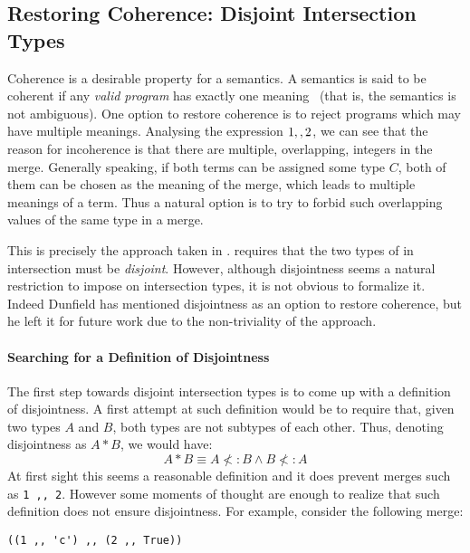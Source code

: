 \subsection{Restoring Coherence: Disjoint Intersection Types}\label{sec:restoring}
Coherence is a desirable property for a semantics. A semantics is said
to be coherent if any \emph{valid program} has exactly one
meaning~\cite{Reynolds:1991} (that is, the semantics is not ambiguous).
One option to restore coherence is to reject programs which may have
multiple meanings.
Analysing the expression $1 ,, 2$, we can see that the reason
for incoherence is that there are multiple, overlapping, integers in the
merge. Generally speaking, if both terms can be assigned some type $C$,
both of them can be chosen as the meaning of the merge,
which leads to multiple meanings of a term.
Thus a natural option is to try to forbid such overlapping
values of the same type in a merge.

This is precisely the approach taken in \name. \name requires that the
two types of in intersection must be \emph{disjoint}.  However,
although disjointness seems a natural restriction to impose on
intersection types, it is not obvious to formalize it. Indeed Dunfield
has mentioned disjointness as an option to restore coherence, but he
left it for future work due to the non-triviality of the approach.

\paragraph{Searching for a Definition of Disjointness}
The first step towards disjoint intersection types is to come up
with a definition of disjointness. A first attempt at such definition would
be to require that, given two types $A$ and $B$, both types are not
subtypes of each other. Thus, denoting disjointness as $A * B$, we would have:
\[A * B \equiv A \not<: B \wedge B \not<: A\]
At first sight this seems a reasonable definition and it does prevent
merges such as \lstinline{1 ,, 2}. However some moments of thought are enough to realize that
such definition does not ensure disjointness. For example, consider
the following merge:

\begin{lstlisting}
((1 ,, 'c') ,, (2 ,, True))
\end{lstlisting}


